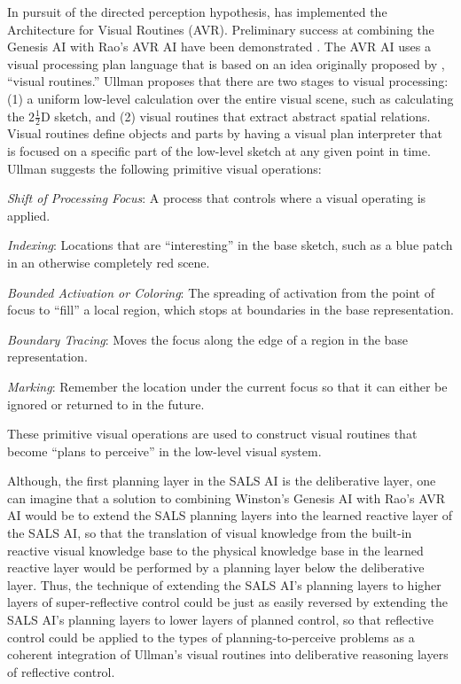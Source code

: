 In pursuit of the directed perception hypothesis, \cite{rao:1998} has
implemented the Architecture for Visual Routines (AVR).  Preliminary
success at combining the Genesis AI with Rao's AVR AI have been
demonstrated \cite[]{winston:2011}.  The AVR AI uses a visual
processing plan language that is based on an idea originally proposed
by \cite{ullman:1984}, ``visual routines.''  Ullman proposes that
there are two stages to visual processing: (1) a uniform low-level
calculation over the entire visual scene, such as calculating the
$2\frac{1}{2}$D sketch, and (2) visual routines that extract abstract
spatial relations.  Visual routines define objects and parts by having
a visual plan interpreter that is focused on a specific part of the
low-level sketch at any given point in time.  Ullman suggests the
following primitive visual operations:
\begin{packed_enumerate}
\item{\emph{Shift of Processing Focus}: A process that controls where
  a visual operating is applied.}
\item{\emph{Indexing}: Locations that are ``interesting'' in the base
  sketch, such as a blue patch in an otherwise completely red scene.}
\item{\emph{Bounded Activation or Coloring}: The spreading of
  activation from the point of focus to ``fill'' a local region, which
  stops at boundaries in the base representation.}
\item{\emph{Boundary Tracing}: Moves the focus along the edge of a
  region in the base representation.}
\item{\emph{Marking}: Remember the location under the current focus so
  that it can either be ignored or returned to in the future.}
\end{packed_enumerate}
These primitive visual operations are used to construct visual
routines that become ``plans to perceive''
\cite[]{pryor:1992,pryorcollins:1995,velez:2011} in the low-level
visual system.

Although, the first planning layer in the SALS AI is the deliberative
layer, one can imagine that a solution to combining Winston's Genesis
AI with Rao's AVR AI would be to extend the SALS planning layers into
the learned reactive layer of the SALS AI, so that the translation of
visual knowledge from the built-in reactive visual knowledge base to
the physical knowledge base in the learned reactive layer would be
performed by a planning layer below the deliberative layer.  Thus, the
technique of extending the SALS AI's planning layers to higher layers
of super-reflective control could be just as easily reversed by
extending the SALS AI's planning layers to lower layers of planned
control, so that reflective control could be applied to the types of
planning-to-perceive problems as a coherent integration of Ullman's
visual routines into deliberative reasoning layers of reflective
control.

